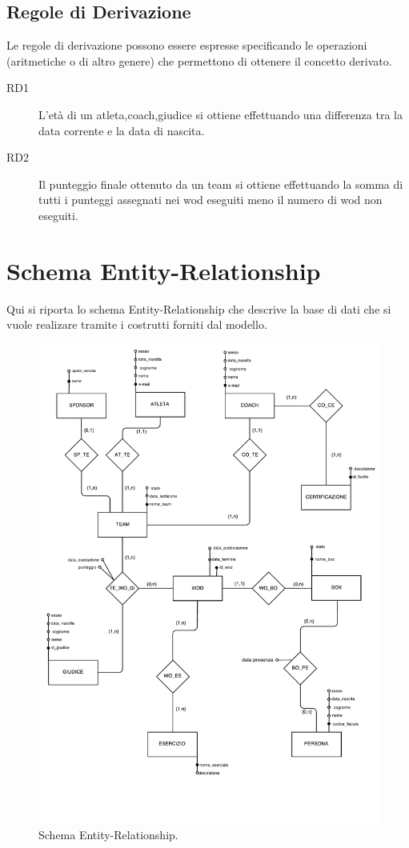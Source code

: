 \documentclass[12pt,a4paper]{article}
\begin{document}
\subsection{Regole di Derivazione}
Le regole di derivazione possono essere espresse specificando le operazioni (aritmetiche o di altro genere) che permettono di ottenere il concetto derivato.
\begin{description}
	\item[RD1] L'età di un atleta,coach,giudice si ottiene effettuando una differenza tra la data corrente e la data di nascita.
	\item[RD2] Il punteggio finale ottenuto da un team si ottiene effettuando la somma di tutti i punteggi assegnati nei wod eseguiti meno il numero di wod non eseguiti.
\end{description}
\section{Schema Entity-Relationship}
Qui si riporta lo schema Entity-Relationship che descrive la base di dati che si vuole realizare tramite i costrutti forniti dal modello.
\begin{figure}
	\centering
	\caption[Entity Relationship]{Schema Entity-Relationship.}
	\includegraphics[width=\textwidth]{schemaer}
\end{figure}
\end{document}
